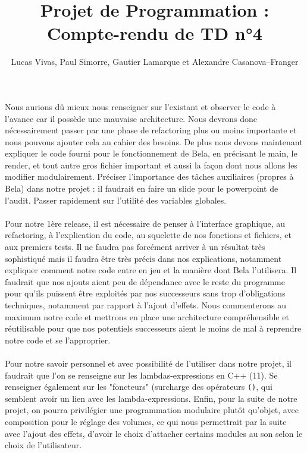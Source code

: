 \documentclass[a4paper]{article}
\title{Projet de Programmation : Compte-rendu de TD n°4}
\author{Lucas Vivas, Paul Simorre, Gautier Lamarque et Alexandre Casanova--Franger}
\begin{document}
\maketitle

\paragraph{}
Nous aurions dû mieux nous renseigner sur l'existant et observer le code à l'avance
car il possède une mauvaise architecture. Nous devrons donc nécessairement passer
par une phase de refactoring plus ou moins importante et nous pouvons ajouter cela
au cahier des besoins. De plus nous devons maintenant expliquer le code fourni
pour le fonctionnement de Bela, en précisant le main, le render, et tout autre
gros fichier important et aussi la façon dont nous allons les modifier modulairement.
Préciser l'importance des tâches auxiliaires (propres à Bela) dans notre
projet : il faudrait en faire un slide pour le powerpoint de l'audit. Passer rapidement
sur l'utilité des variables globales.

\paragraph{}
Pour notre 1ère release, il est nécessaire de penser à l'interface graphique, au
refactoring, à l'explication du code, au squelette de nos fonctions et fichiers,
et aux premiers tests. Il ne faudra pas forcément arriver à un résultat très
sophistiqué mais il faudra être très précis dans nos explications, notamment expliquer
comment notre code entre en jeu et la manière dont Bela l'utilisera. Il faudrait
que nos ajouts aient peu de dépendance avec le reste du programme pour qu'ils puissent
être exploités par nos successeurs sans trop d'obligations techniques, notamment
par rapport à l'ajout d'effets. Nous commenterons au maximum notre code et mettrons
en place une architecture compréhensible et réutilisable pour que nos potentiels successeurs
aient le moins de mal à reprendre notre code et se l'approprier.

\paragraph{}
Pour notre savoir personnel et avec possibilité de l'utiliser dans notre projet,
il faudrait que l'on se renseigne sur les lambdas-expressions en C++ (11). Se
renseigner également sur les "foncteurs" (surcharge des opérateurs \verb!()!,
qui semblent avoir un lien avec les lambda-expressions. Enfin, pour la suite de
notre projet, on pourra privilégier une programmation modulaire plutôt qu'objet,
avec composition pour le réglage des volumes, ce qui nous permettrait par la suite
avec l'ajout des effets, d'avoir le choix d'attacher certains modules au son selon
le choix de l'utilisateur.
\end{document}
